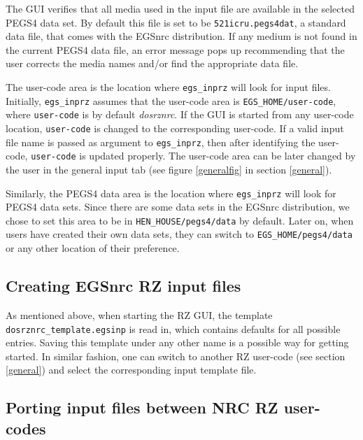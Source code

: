 \documentclass[12pt,twoside]{article}   %
\begin{document}
The GUI verifies that all media used in the input file are available in the selected
PEGS4 data set. By default this file is set to be {\tt 521icru.pegs4dat}, a standard data
file, that comes with the EGSnrc distribution. If any medium is not found in the
current PEGS4 data file, an error message pops up recommending that the user corrects the
media names and/or find the appropriate data file.

The user-code area is the location where {\tt egs\_inprz} will look for input files. Initially,
{\tt egs\_inprz} assumes that the user-code area is {\tt EGS\_HOME/user-code}, where {\tt user-code}
is by default {\em dosrznrc}. If the GUI is started from any user-code location, {\tt user-code}
is changed to the corresponding user-code. If a valid input file name is passed as argument to
{\tt egs\_inprz}, then after identifying the user-code, {\tt user-code} is updated properly.
The user-code area can
be later changed by the user in the general input tab (see figure \ref{generalfig} in section
\ref{general}).

Similarly, the PEGS4 data area is the location where {\tt egs\_inprz} will look for PEGS4 data sets.
Since
there are some data sets in the EGSnrc distribution, we chose to set this area to be in
{\tt HEN\_HOUSE/pegs4/data} by default. Later on, when users have created their own data sets, they
can switch to {\tt EGS\_HOME/pegs4/data} or any other location of their preference.


\subsection{Creating EGSnrc RZ input files}
\label{creating }

As mentioned above, when starting the RZ GUI, the template {\tt dosrznrc\_template.egsinp} is
read in, which contains defaults for all possible entries. Saving this template under any other
name is a possible way for getting started. In similar fashion, one can switch to another RZ
user-code (see section \ref{general}) and select the corresponding input template file.

\subsection{Porting input files between NRC RZ user-codes}
\label{modifying}
\end{document}
